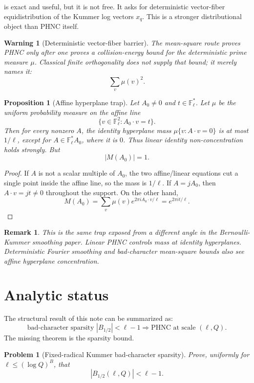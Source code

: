 \documentclass[11pt]{article}
\newtheorem{proposition}{Proposition}
\newtheorem{remark}{Remark}
\newtheorem{warning}{Warning}
\newtheorem{problem}{Problem}
\newcommand{\F}{\mathbb F}
\newcommand{\1}{\mathbf 1}
\begin{document}
 is exact and useful, but it is not free.  It asks for deterministic vector-fiber equidistribution of the Kummer log vectors \(x_q\).  This is a stronger distributional object than PHNC itself.

\begin{warning}[Deterministic vector-fiber barrier]
The mean-square route proves PHNC only after one proves a collision-energy bound for the deterministic prime measure \(\mu\).  Classical finite orthogonality does not supply that bound; it merely names it:
\[
\sum_v\mu(v)^2.
\]
\end{warning}

\begin{proposition}[Affine hyperplane trap]\label{P:affine}
Let \(A_0\ne0\) and \(t\in\F_\ell^*\).  Let \(\mu\) be the uniform probability measure on the affine line
\[
\{v\in\F_\ell^2:A_0\cdot v=t\}.
\]
Then for every nonzero \(A\), the identity hyperplane mass \(\mu\{v:A\cdot v=0\}\) is at most \(1/\ell\), except for \(A\in\F_\ell^*A_0\), where it is \(0\).  Thus linear identity non-concentration holds strongly.  But
\[
|M(A_0)|=1.
\]
\end{proposition}

\begin{proof}
If \(A\) is not a scalar multiple of \(A_0\), the two affine/linear equations cut a single point inside the affine line, so the mass is \(1/\ell\).  If \(A=jA_0\), then \(A\cdot v=jt\ne0\) throughout the support.  On the other hand,
\[
M(A_0)=\sum_v\mu(v)e^{2\pi i A_0\cdot v/\ell}=e^{2\pi it/\ell}.
\]
\end{proof}

\begin{remark}
This is the same trap exposed from a different angle in the Bernoulli-Kummer smoothing paper.  Linear PHNC controls mass at identity hyperplanes.  Deterministic Fourier smoothing and bad-character mean-square bounds also see affine hyperplane concentration.
\end{remark}

\section{Analytic status}

The structural result of this note can be summarized as:
\[
\boxed{
\text{bad-character sparsity } |B_{1/2}|<\ell-1
\Longrightarrow
\text{PHNC at scale }(\ell,Q).
}
\]
The missing theorem is the sparsity bound.

\begin{problem}[Fixed-radical Kummer bad-character sparsity]\label{P:kummer-sparsity}
Prove, uniformly for \(\ell\le(\log Q)^B\), that
\[
|B_{1/2}(\ell,Q)|<\ell-1.
\]
\end{problem}
\end{document}
